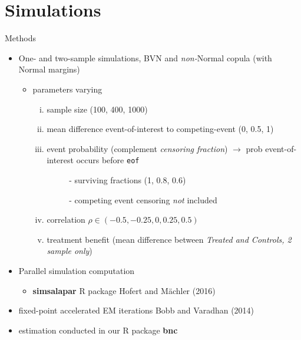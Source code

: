 \hypertarget{results}{%
\section{Simulations}\label{simulations}}

\begin{frame}[fragile]{Methods}
\protect\hypertarget{methods}{}

\begin{itemize}
\tightlist
\item
  One- and two-sample simulations, BVN and \emph{non-}Normal copula
  (with Normal margins)

  \begin{itemize}
  \tightlist
  \item
    parameters varying

    \begin{enumerate}
    [i.]
    \tightlist
    \item
      sample size (100, 400, 1000)
    \item
      mean difference event-of-interest to competing-event (0, 0.5, 1)
    \item
      event probability (complement \emph{censoring fraction}) $\to$ prob event-of-interest occurs before \texttt{eof}
        \begin{itemize}
        \tightlist
        \item[~~-]
          surviving fractions (1, 0.8, 0.6)
        \item[~~-]
          competing event censoring \emph{not} included
        \end{itemize}
    \item
      \alert{correlation} \(\rho \in (-0.5,-0.25, 0, 0.25, 0.5)\)
    \item
      \alert{treatment benefit} (mean difference between \emph{Treated
      and Controls, 2 sample only})
    \end{enumerate} %
  \end{itemize}

\item
  Parallel simulation computation
  \begin{itemize}
  \tightlist
  \item
    \textbf{simsalapar} R package Hofert and Mächler (2016)
  \end{itemize}

\item
  fixed-point accelerated EM iterations Bobb and Varadhan (2014)
\item
  estimation conducted in our R package \textbf{bnc}
\end{itemize}

\end{frame}